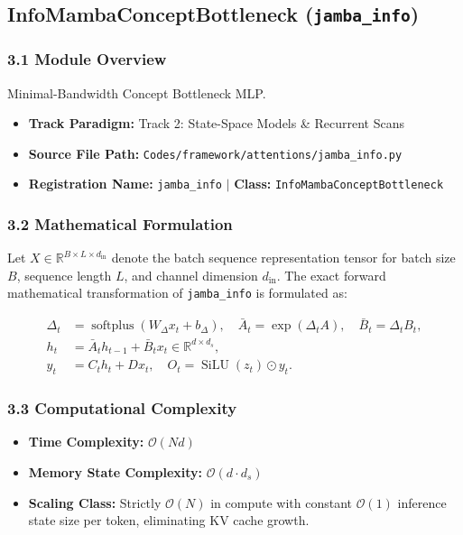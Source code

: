 \subsection{InfoMambaConceptBottleneck (\texttt{jamba\_info})}
\label{sec:app_module_jamba_info}

\subsubsection*{3.1 Module Overview}
Minimal-Bandwidth Concept Bottleneck MLP.
\begin{itemize}
    \item \textbf{Track Paradigm:} Track 2: State-Space Models \& Recurrent Scans
    \item \textbf{Source File Path:} \texttt{Codes/framework/attentions/jamba\_info.py}
    \item \textbf{Registration Name:} \texttt{jamba\_info} $\mid$ \textbf{Class:} \texttt{InfoMambaConceptBottleneck}
\end{itemize}

\subsubsection*{3.2 Mathematical Formulation}
Let $X \in \mathbb{R}^{B \times L \times d_{\text{in}}}$ denote the batch sequence representation tensor for batch size $B$, sequence length $L$, and channel dimension $d_{\text{in}}$. The exact forward mathematical transformation of \texttt{jamba\_info} is formulated as:

\begin{align}
\Delta_t &= \operatorname{softplus}(W_\Delta x_t + b_\Delta), \quad \bar{A}_t = \exp(\Delta_t A), \quad \bar{B}_t = \Delta_t B_t, \\
h_t &= \bar{A}_t h_{t-1} + \bar{B}_t x_t \in \mathbb{R}^{d \times d_s}, \\
y_t &= C_t h_t + D x_t, \quad O_t = \operatorname{SiLU}(z_t) \odot y_t.
\end{align}


\subsubsection*{3.3 Computational Complexity}
\begin{itemize}
    \item \textbf{Time Complexity:} $\mathcal{O}(N d)$
    \item \textbf{Memory State Complexity:} $\mathcal{O}(d \cdot d_s)$
    \item \textbf{Scaling Class:} Strictly $\mathcal{O}(N)$ in compute with constant $\mathcal{O}(1)$ inference state size per token, eliminating KV cache growth.
\end{itemize}

